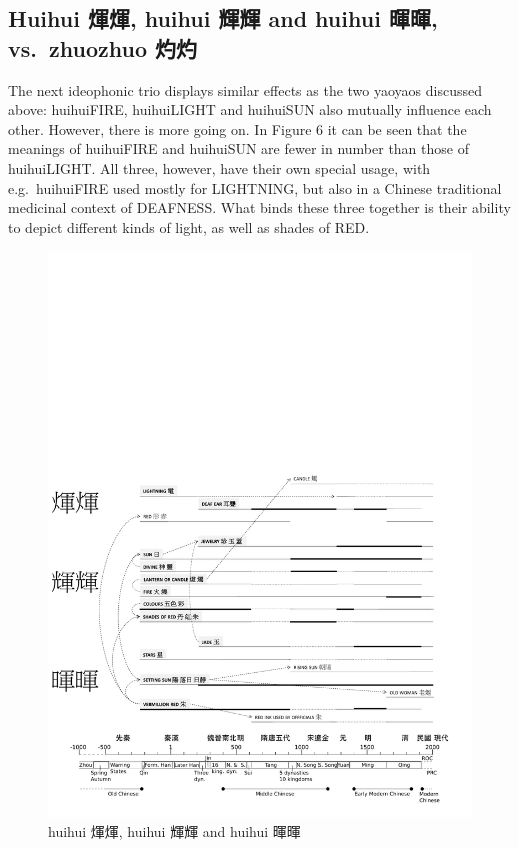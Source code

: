 \subsection{Huihui 煇煇, huihui 輝輝 and huihui 暉暉, vs.~zhuozhuo
灼灼}\label{huihui--huihui--and-huihui--vs.zhuozhuo-}

The next ideophonic trio displays similar effects as the two yaoyaos
discussed above: huihuiFIRE, huihuiLIGHT and huihuiSUN also mutually
influence each other. However, there is more going on. In Figure 6 it
can be seen that the meanings of huihuiFIRE and huihuiSUN are fewer in
number than those of huihuiLIGHT. All three, however, have their own
special usage, with e.g.~huihuiFIRE used mostly for LIGHTNING, but also
in a Chinese traditional medicinal context of DEAFNESS. What binds these
three together is their ability to depict different kinds of light, as
well as shades of RED.

\begin{figure}
\centering
\includegraphics{ideos/huihui.pdf}
\caption{\label{fig:huihui}huihui 煇煇, huihui 輝輝 and huihui 暉暉}
\end{figure}

